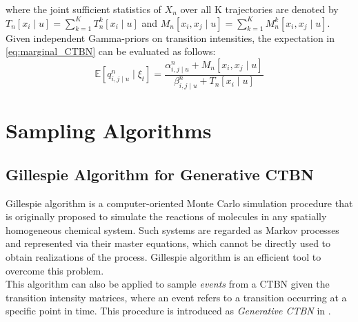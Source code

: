where the joint sufficient statistics of $ X_n $ over all K trajectories are denoted by  $ T_{n}[x_i\mid u] = \sum_{k=1}^{K} T_{n}^k[x_i\mid u] $ and $ M_{n}[x_i, x_j\mid u] =\sum_{k=1}^{K} M_{n}^k[x_i, x_j\mid u]$.\\
Given independent Gamma-priors on transition intensities, the expectation in \autoref{eq:marginal_CTBN} can be evaluated as follows:
\begin{equation}
	\mathbb{E}\left[q_{i,j\mid u}^{n} \mid \xi_{t}\right]=\frac{\alpha^n_{i,j\mid u}+M_{n}[x_i, x_j\mid u]}{\beta^n_{i,j\mid u}+T_{n}[x_i \mid u]}
	\label{eq:estimated_Q}
\end{equation}


\section{Sampling Algorithms}
\label{sec:sampling_alg}
\subsection{Gillespie Algorithm for Generative CTBN}
Gillespie algorithm is a computer-oriented Monte Carlo simulation procedure that is originally proposed to simulate the reactions of molecules in any spatially homogeneous chemical system. Such systems are regarded as Markov processes and represented via their master equations, which cannot be directly used to obtain realizations of the process. Gillespie algorithm is an efficient tool to overcome this problem. \cite{Gillespie1976}\\
This algorithm can also be applied to sample \textit{events} from a CTBN given the transition intensity matrices, where an event refers to a transition occurring at a specific point in time. This procedure is introduced as \textit{Generative CTBN} in \cite{Nodelman1995}.


